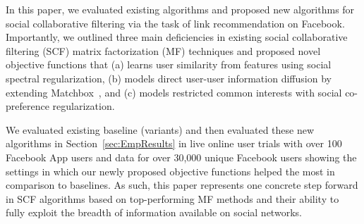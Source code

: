 

In this paper, we evaluated existing algorithms and proposed new
algorithms for social collaborative filtering via the task of link
recommendation on Facebook.  Importantly, we outlined three main
deficiencies in existing social collaborative filtering (SCF) matrix
factorization (MF) techniques and proposed novel objective functions
that (a) learns user similarity from features using social spectral
regularization, (b) models direct user-user information diffusion by
extending Matchbox~\cite{matchbox}, and (c) models restricted common
interests with social co-preference regularization.

We evaluated existing baseline (variants) and then evaluated these new
algorithms in Section~\ref{sec:EmpResults} in live online user trials
with over 100 Facebook App users and data for over 30,000 unique
Facebook users showing the settings in which our newly proposed
objective functions helped the most in comparison to baselines.  As
such, this paper represents one concrete step forward in SCF
algorithms based on top-performing MF methods and their ability to
fully exploit the breadth of information available on social networks.


